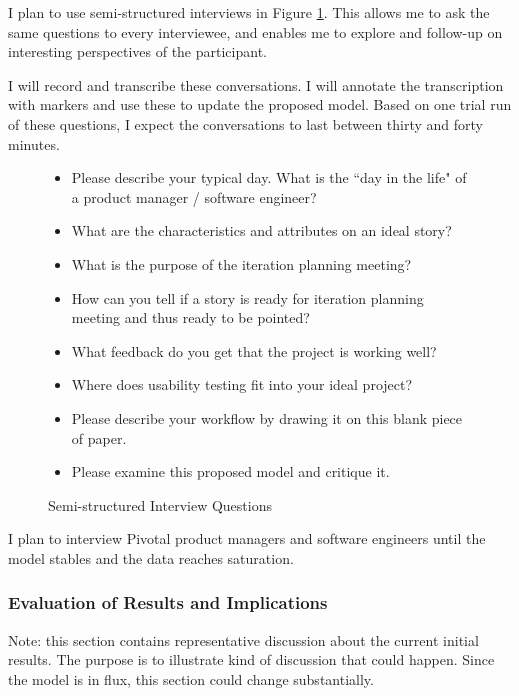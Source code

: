 \documentclass[preprint,12pt,3p]{elsarticle}
\begin{document}
I plan to use semi-structured interviews in Figure \ref{InterviewQuestions}. This allows me to ask the same questions to every interviewee, and enables me to explore and follow-up on interesting perspectives of the participant.

I will record and transcribe these conversations. I will annotate the transcription with markers and use these to update the proposed model. Based on one trial run of these questions, I expect the conversations to last between thirty and forty minutes. 

\begin{figure}[h]\vspace*{4pt}
\caption{Semi-structured Interview Questions}\vspace*{-6pt}\label{InterviewQuestions}
\begin{itemize}
\item Please describe your typical day. What is the ``day in the life" of a product manager / software engineer?
\item What are the characteristics and attributes on an ideal story?
\item What is the purpose of the iteration planning meeting?
\item How can you tell if a story is ready for iteration planning meeting and thus ready to be pointed?
\item What feedback do you get that the project is working well?
\item Where does usability testing fit into your ideal project?
\item Please describe your workflow by drawing it on this blank piece of paper.
\item Please examine this proposed model and critique it.
\end{itemize}
\end{figure}

I plan to interview Pivotal product managers and software engineers until the model stables and the data reaches saturation.

\subsubsection{Evaluation of Results and Implications}

Note: this section contains representative discussion about the current initial results. The purpose is to illustrate kind of discussion that could happen. Since the model is in flux, this section could change substantially.
\end{document}
